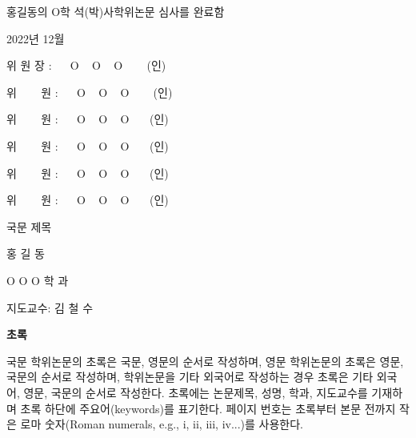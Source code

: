 \documentclass[11pt]{report}
\begin{document}
\newpage 
\par\vspace{1cm}
\Large 홍길동의 O학 석(박)사학위논문 심사를 완료함
\par\vspace{3cm} %
\large 2022년 12월 %
\par\vspace{2cm}
\Large 
위 원 장 : ~~ O ~ O ~ O ~~~ (인) \par 
\vspace{1cm}
위 ~~~ 원 : ~~ O ~ O ~ O ~~~ (인) \par
\vspace{1cm}
위 ~~~ 원 : ~~ O ~ O ~ O ~~~(인) \par
\vspace{1cm}
위 ~~~ 원 : ~~ O ~ O ~ O ~~~(인) \par %
\vspace{1cm}
위 ~~~ 원 : ~~ O ~ O ~ O ~~~(인) \par %
\vspace{1cm}
위 ~~~ 원 : ~~ O ~ O ~ O ~~~(인) \par %

\newpage
{}
\begin{center}
\LARGE 국문 제목
\par\vspace{20pt}
\doublespacing
\normalsize 홍 길 동\par
O O O 학 과\par
지도교수: 김 철 수

\par\vspace{20pt}
\LARGE \textbf{초록}
\end{center}
\justifying
\doublespacing
\normalsize
국문 학위논문의 초록은 국문, 영문의 순서로 작성하며, 영문 학위논문의 초록은 영문, 국문의 순서로 작성하며, 학위논문을 기타 외국어로 작성하는 경우 초록은 기타 외국어, 영문, 국문의 순서로 작성한다.
초록에는 논문제목, 성명, 학과, 지도교수를 기재하며 초록 하단에 주요어(keywords)를 표기한다. 
페이지 번호는 초록부터 본문 전까지 작은 로마 숫자(Roman numerals, e.g., i, ii, iii, iv...)를 사용한다.
\par\vspace{1cm}
\end{document}
